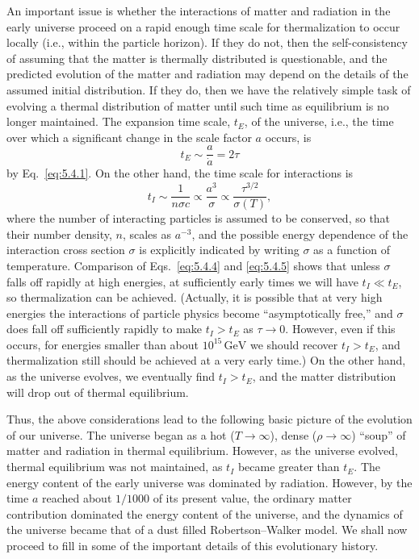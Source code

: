An important issue is whether the interactions of matter and radiation in the early
universe proceed on a rapid enough time scale for thermalization to occur locally
(i.e., within the particle horizon). If they do not, then the self-consistency of
assuming that the matter is thermally distributed is questionable, and the predicted
evolution of the matter and radiation may depend on the details of the assumed initial
distribution. If they do, then we have the relatively simple task of evolving a thermal
distribution of matter until such time as equilibrium is no longer maintained. The
expansion time scale, \(t_E\), of the universe, i.e., the time over which a significant
change in the scale factor \(a\) occurs, is
\begin{equation}
  t_E\sim\frac{a}{\dot a}=2\tau
  \tag{5.4.4}\label{eq:5.4.4}
\end{equation}
by Eq.~\eqref{eq:5.4.1}. On the other hand, the time scale for interactions is
\begin{equation}
  t_I\sim\frac{1}{n\sigma c}\propto\frac{a^3}{\sigma}
  \propto\frac{\tau^{3/2}}{\sigma(T)},
  \tag{5.4.5}\label{eq:5.4.5}
\end{equation}
where the number of interacting particles is assumed to be conserved, so that their
number density, \(n\), scales as \(a^{-3}\), and the possible energy dependence of
the interaction cross section \(\sigma\) is explicitly indicated by writing \(\sigma\)
as a function of temperature. Comparison of Eqs.~\eqref{eq:5.4.4} and
\eqref{eq:5.4.5} shows that unless \(\sigma\) falls off rapidly at high energies, at
sufficiently early times we will have \(t_I\ll t_E\), so thermalization can be achieved.
(Actually, it is possible that at very high energies the interactions of particle physics
become ``asymptotically free,'' and \(\sigma\) does fall off sufficiently rapidly to make
\(t_I>t_E\) as \(\tau\to0\). However, even if this occurs, for energies smaller than
about \(10^{15}\,\mathrm{GeV}\) we should recover \(t_I>t_E\), and thermalization still
should be achieved at a very early time.) On the other hand, as the universe evolves,
we eventually find \(t_I>t_E\), and the matter distribution will drop out of thermal
equilibrium.

Thus, the above considerations lead to the following basic picture of the evolution
of our universe. The universe began as a hot (\(T\to\infty\)), dense
(\(\rho\to\infty\)) ``soup'' of matter and radiation in thermal equilibrium. However,
as the universe evolved, thermal equilibrium was not maintained, as \(t_I\) became
greater than \(t_E\). The energy content of the early universe was dominated by
radiation. However, by the time \(a\) reached about \(1/1000\) of its present value,
the ordinary matter contribution dominated the energy content of the universe, and
the dynamics of the universe became that of a dust filled Robertson--Walker model.
We shall now proceed to fill in some of the important details of this evolutionary
history.

